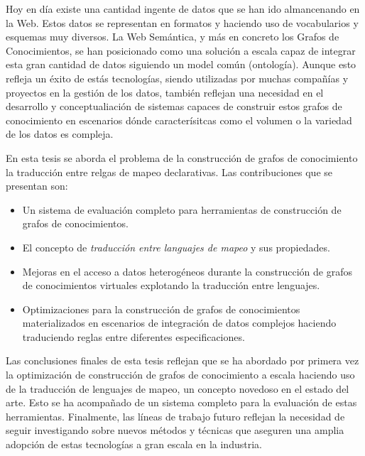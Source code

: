 \cleardoublepage
\begin{abstractslongSpanish}
Hoy en día existe una cantidad ingente de datos que se han ido almancenando en la Web. Estos datos se representan en formatos y haciendo uso de vocabularios y esquemas muy diversos. La Web Semántica, y más en concreto los Grafos de Conocimientos, se han posicionado como una solución a escala capaz de integrar esta gran cantidad de datos siguiendo un model común (ontología). Aunque esto refleja un éxito de estás tecnologías, siendo utilizadas por muchas compañías y proyectos en la gestión de los datos, también reflejan una necesidad en el desarrollo y conceptualiación de sistemas capaces de construir estos grafos de conocimiento en escenarios dónde caracterísitcas como el volumen o la variedad de los datos es compleja. 

En esta tesis se aborda el problema de la construcción de grafos de conocimiento la traducción entre relgas de mapeo declarativas. Las contribuciones que se presentan son:
\begin{itemize}
    \item Un sistema de evaluación completo para herramientas de construcción de grafos de conocimientos. 
    \item El concepto de \textit{traducción entre languajes de mapeo} y sus propiedades.
    \item Mejoras en el acceso a datos heterogéneos durante la construcción de grafos de conocimientos virtuales explotando la traducción entre lenguajes.
    \item Optimizaciones para la construcción de grafos de conocimientos materializados en escenarios de integración de datos complejos haciendo traduciendo reglas entre diferentes especificaciones.
\end{itemize}

Las conclusiones finales de esta tesis reflejan que se ha abordado por primera vez la optimización de construcción de grafos de conocimiento a escala haciendo uso de la traducción de lenguajes de mapeo, un concepto novedoso en el estado del arte. Esto se ha acompañado de un sistema completo para la evaluación de estas herramientas. Finalmente, las líneas de trabajo futuro reflejan la necesidad de seguir investigando sobre nuevos métodos y técnicas que aseguren una amplia adopción de estas tecnologías a gran escala en la industria.



\end{abstractslongSpanish}
